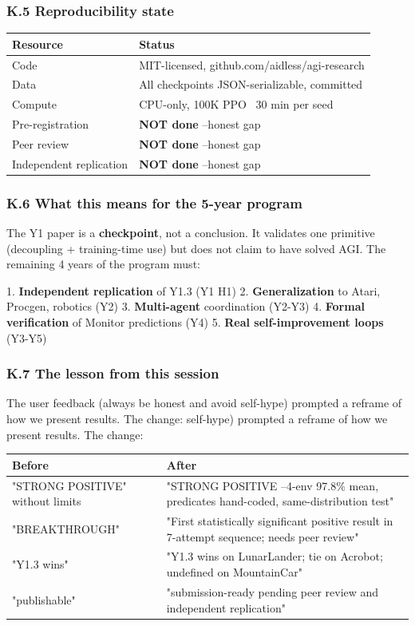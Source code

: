 \documentclass[11pt]{article}
\begin{document}
\subsubsection{K.5 Reproducibility state}

\begin{tabular}{ll}
Resource & Status \\
\hline
Code & MIT-licensed, github.com/aidless/agi-research \\
Data & All checkpoints JSON-serializable, committed \\
Compute & CPU-only, 100K PPO ~30 min per seed \\
Pre-registration & \textbf{NOT done} --honest gap \\
Peer review & \textbf{NOT done} --honest gap \\
Independent replication & \textbf{NOT done} --honest gap \\
\end{tabular}


\subsubsection{K.6 What this means for the 5-year program}

The Y1 paper is a \textbf{checkpoint}, not a conclusion. It validates one
primitive (decoupling + training-time use) but does not claim to have
solved AGI. The remaining 4 years of the program must:

1. \textbf{Independent replication} of Y1.3 (Y1 H1)
2. \textbf{Generalization} to Atari, Procgen, robotics (Y2)
3. \textbf{Multi-agent} coordination (Y2-Y3)
4. \textbf{Formal verification} of Monitor predictions (Y4)
5. \textbf{Real self-improvement loops} (Y3-Y5)

\subsubsection{K.7 The lesson from this session}

The user feedback (always be honest and avoid self-hype) prompted a reframe of how we present results. The change:
self-hype) prompted a reframe of how we present results. The change:

\begin{tabular}{ll}
Before & After \\
\hline
"STRONG POSITIVE" without limits & "STRONG POSITIVE --4-env 97.8\% mean, predicates hand-coded, same-distribution test" \\
"BREAKTHROUGH" & "First statistically significant positive result in 7-attempt sequence; needs peer review" \\
"Y1.3 wins" & "Y1.3 wins on LunarLander; tie on Acrobot; undefined on MountainCar" \\
"publishable" & "submission-ready pending peer review and independent replication" \\
\end{tabular}
\end{document}
